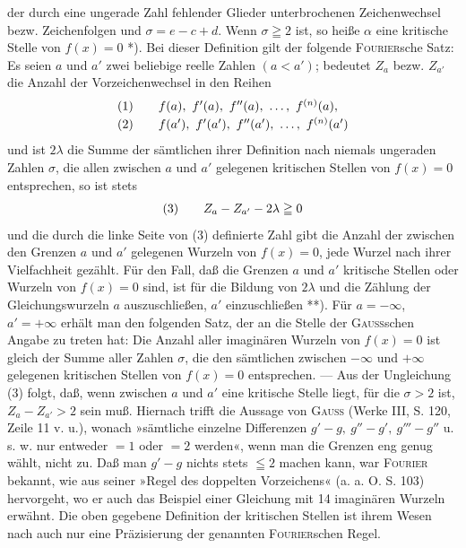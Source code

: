 {\small\noindent der durch eine ungerade Zahl fehlender Glieder unterbrochenen Zeichenwechsel bezw. Zeichenfolgen und
$\sigma=e-c+d$. Wenn $\sigma\geqq2$ ist, so heiße $\alpha$ eine kritische Stelle von $f(x)=0$ *). Bei dieser Definition
gilt der folgende  \textsc{Fourier}sche Satz: Es seien $a$ und $a'$ zwei beliebige reelle Zahlen $(a<a')$;
bedeutet $Z_a$ bezw. $Z_{a'}$ die Anzahl der Vorzeichenwechsel in den Reihen
\[
\begin{array}{r@{\qquad}l}
(1)&f(a),\ f'(a),\ f''(a),\ \ldots,\ f^{(n)}(a),\\[.5ex]
(2)&f(a'),\ f'(a'),\ f''(a'),\ \ldots,\ f^{(n)}(a')
\end{array}
\]
und ist $2\lambda$ die Summe der sämtlichen ihrer Definition nach niemals ungeraden Zahlen $\sigma$, die allen zwischen
$a$ und $a'$ gelegenen kritischen Stellen von $f(x)=0$ entsprechen, so ist stets
\[
\begin{array}{r@{\qquad}l}(3)&Z_a-Z_{a'}-2\lambda\geqq0\end{array}
\]
und die durch die linke Seite von (3) definierte Zahl gibt die  Anzahl der zwischen den Grenzen
$a$ und $a'$ gelegenen Wurzeln von $f(x)=0$, jede Wurzel nach ihrer Vielfachheit gezählt. Für den Fall,
daß die Grenzen $a$ und $a'$ kritische Stellen oder Wurzeln von $f(x)=0$ sind, ist für die Bildung von
$2\lambda$ und die Zählung der Gleichungswurzeln $a$ auszuschließen, $a'$ einzuschließen **). Für $a=-\infty$,
$a'=+\infty$ erhält man den folgenden Satz, der an die Stelle der \textsc{Gauss}schen Angabe zu treten hat: Die
Anzahl aller imaginären Wurzeln von $f(x)=0$ ist gleich der Summe aller Zahlen $\sigma$, die den sämtlichen
zwischen $-\infty$ und $+\infty$ gelegenen kritischen Stellen von $f(x)=0$ entsprechen. — Aus der Ungleichung
(3) folgt, daß, wenn zwischen $a$ und $a'$ eine kritische Stelle liegt, für die $\sigma>2$ ist, $Z_a-Z_{a'}>2$ sein muß.
Hiernach trifft die Aussage von \textsc{Gauss} (Werke III, S. 120, Zeile 11 v. u.), wonach »sämtliche einzelne
Differenzen $g'-g,\ g''-g',\ g'''-g''$ u. s. w. nur entweder $=1$ oder $=2$ werden«, wenn man die Grenzen
eng genug wählt, nicht zu. Daß man $g'-g$ nichts stets $\leqq2$ machen kann, war \textsc{Fourier} bekannt, wie
aus seiner »Regel des doppelten Vorzeichens« (a. a. O. S. 103) hervorgeht, wo er auch das Beispiel einer
Gleichung mit 14 imaginären Wurzeln erwähnt. Die oben gegebene Definition der kritischen Stellen ist
ihrem Wesen nach auch nur eine Präzisierung der genannten \textsc{Fourier}schen Regel.

}
